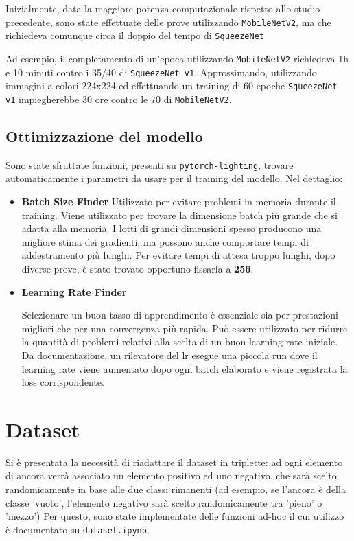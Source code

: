 \documentclass[11pt]{article}
\begin{document}
Inizialmente, data la maggiore potenza computazionale rispetto allo studio precedente,
sono state effettuate delle prove utilizzando \texttt{MobileNetV2}, ma che richiedeva
comunque circa il doppio del tempo di \texttt{SqueezeNet}

Ad esempio, il completamento di un'epoca utilizzando \texttt{MobileNetV2} richiedeva 1h e 10 minuti
contro i 35/40 di \texttt{SqueezeNet v1}. Approssimando, utilizzando immagini a colori 224x224
ed effettuando un training di 60 epoche \texttt{SqueezeNet v1} impiegherebbe 30 ore contro le 70 di \texttt{MobileNetV2}.

\subsection{Ottimizzazione del modello}

Sono state sfruttate funzioni, presenti su \texttt{pytorch-lighting}, trovare automaticamente 
i parametri da usare per il training del modello.
Nel dettaglio:

\begin{itemize}
    \item {\textbf{Batch Size Finder} 
        Utilizzato per evitare problemi in memoria durante il training. Viene utilizzato
        per trovare la dimensione batch più grande che si adatta alla memoria. I lotti di grandi
        dimensioni spesso producono una migliore stima dei gradienti,
        ma possono anche comportare tempi di addestramento più lunghi. Per evitare tempi
        di attesa troppo lunghi, dopo diverse prove, è stato trovato opportuno fissarla a \textbf{256}.
    }
    \item \textbf{Learning Rate Finder} {

        Selezionare un buon tasso di apprendimento è essenziale sia per
        prestazioni migliori che per una convergenza più rapida. Può essere utilizzato per ridurre
        la quantità di problemi relativi alla scelta di un buon learning rate iniziale. Da documentazione,
        un rilevatore del lr esegue una piccola run dove il learning rate viene aumentato dopo ogni batch elaborato
        e viene registrata la loss corrispondente.
    }

\end{itemize}

\section{Dataset}

Si è presentata la necessità di riadattare il dataset in triplette: ad ogni elemento di ancora verrà
associato un elemento positivo ed uno negativo, che sarà scelto randomicamente in base alle due classi rimanenti
(ad esempio, se l'ancora è della classe 'vuoto', l'elemento negativo sarà scelto randomicamente tra 'pieno' o 'mezzo')
Per questo, sono state implementate delle funzioni ad-hoc il cui utilizzo è documentato su \texttt{dataset.ipynb}. 
\end{document}
